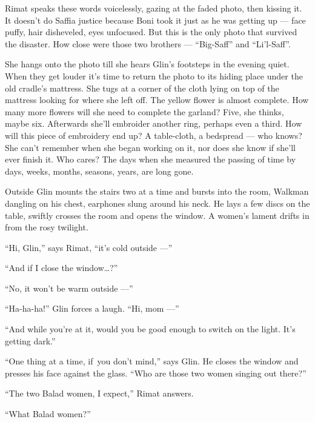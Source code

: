\documentclass[twoside,11pt,openany]{book}
\begin{document}
Rimat speaks these words voicelessly, gazing at the faded photo, then kissing it.
It doesn't do Saffia
justice because Boni took it just as he was getting up --- face
puffy, hair disheveled,
eyes unfocused. But this is the only photo that survived the
disaster. How close were those two brothers --- ``Big-Saff{}''
and ``Li'l-Saff''.

S{he hangs onto the photo till she hears Glin's footsteps in the
evening quiet. When }they get louder {it's time to return the photo
to its hiding place under the old cradle's mattress. She tugs at a corner of
the}{ }cloth lying on top of the
mattress{ looking for where she left off. The yellow flower is almost
complete. How many more flowers will she need} {to complete the
garland? Five, she }thinks{, maybe six. Afterwards she'll embroider
another }ring, p{erhaps even a third.
}How{ will this piece of embroidery
end }up?{ }A{
table{}-cloth,} a {bedspread --- who knows? She can't remember when
she began working on }it, nor does she know if she'll {ever finish
it. Who cares? }The days when she measured the passing of time by days, weeks, months, seasons, years,  are long
gone.

Outside Glin mounts the
stairs two at a time and bursts into the room, Walkman dangling on
his chest, earphones slung around his neck. He lays a few discs on
the table, swiftly crosses the room and opens the window.
A women's lament drifts in from the rosy twilight.

``Hi, Glin,'' says Rimat, ``it's cold outside ---''

``And if I{ close the window{\ldots}?''}

``No, it won't be warm outside ---''

``Ha-ha-ha!'' Glin forces a
laugh. ``Hi, mom ---'' 

``And while you're at it, would you be good enough to switch on
the light. It's getting dark.''

``One thing at a time, if~you don't
mind{,'' says Glin. He closes the window and presses his face against
the glass}.{ ``Who are those
}two{ }{women singing out
there?''}

``The two Balad women, I
expect,'' Rimat answers.

``What Balad women?''
\end{document}
